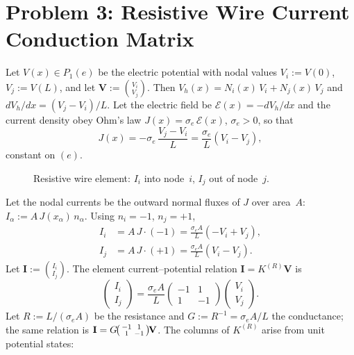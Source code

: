 \documentclass[11pt, a4paper]{article}
\begin{document}
\section{Problem 3: Resistive Wire Current Conduction Matrix}

Let $V(x)\in P_1(e)$ be the electric potential with nodal values $V_i:=V(0)$, $V_j:=V(L)$, and let $\mathbf{V}:=\binom{V_i}{V_j}$.  Then $V_h(x)=N_i(x)\,V_i+N_j(x)\,V_j$ and $dV_h/dx=(V_j-V_i)/L$.  Let the electric field be $\mathcal{E}(x)=-dV_h/dx$ and the current density obey Ohm's law $J(x)=\sigma_e\,\mathcal{E}(x)$, $\sigma_e>0$, so that
\[
J(x)=-\sigma_e\,\frac{V_j-V_i}{L}=\frac{\sigma_e}{L}(V_i-V_j),
\]
constant on $(e)$.

\begin{figure}[H]
\centering
{}
\caption{Resistive wire element: $I_i$ into node~$i$, $I_j$ out of node~$j$.}
\label{fig:resist}
\end{figure}

Let the nodal currents be the outward normal fluxes of $J$ over area~$A$: $I_\alpha:= A\,J(x_\alpha)\,n_\alpha$.  Using $n_i=-1$, $n_j=+1$,
\begin{align}
I_i&= A\,J\cdot(-1)=\frac{\sigma_e A}{L}(-V_i+V_j),\\[4pt]
I_j&= A\,J\cdot(+1)=\frac{\sigma_e A}{L}(V_i-V_j).
\end{align}
Let $\mathbf{I}:=\binom{I_i}{I_j}$.  The element current--potential relation $\mathbf{I}=K^{(R)}\mathbf{V}$ is
\[
\boxed{
\begin{pmatrix} I_i\\[2pt] I_j\end{pmatrix}
=\frac{\sigma_e A}{L}
\begin{pmatrix} -1 & 1\\[2pt] 1 & -1\end{pmatrix}
\begin{pmatrix} V_i\\[2pt] V_j\end{pmatrix}.
}
\]
Let $R:=L/(\sigma_e A)$ be the resistance and $G:=R^{-1}=\sigma_e A/L$ the conductance; the same relation is $\mathbf{I}=G\!\begin{psmallmatrix}-1&1\\1&-1\end{psmallmatrix}\!\mathbf{V}$.  The columns of $K^{(R)}$ arise from unit potential states:
\end{document}
